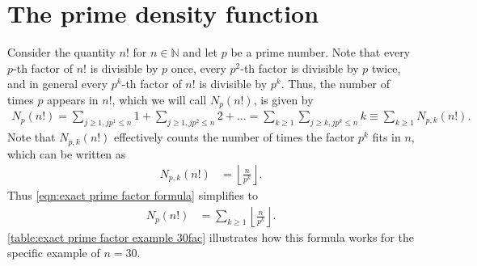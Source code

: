 \documentclass[english, parskip=full]{scrartcl}
\title{\titel}
\author{\autor}
\date{\today}
\begin{document}
\maketitle  %


\section{The prime density function}
Consider the quantity $n!$ for $n\in\mathbb{N}$ and let $p$ be a prime number.
Note that every $p$-th factor of $n!$ is divisible by $p$ once, every $p^2$-th factor is divisible by $p$ twice, and in general every $p^k$-th factor of $n!$ is divisible by $p^k$.
Thus, the number of times $p$ appears in $n!$, which we will call $N_p(n!)$, is given by
\begin{align}
N_p(n!) = \sum_{j\ge 1, jp^1\le n}1 + \sum_{j\ge 1, jp^2\le n}2 + \dots = \sum_{k \ge 1} \sum_{j \ge k, jp^k \le n} k \equiv \sum_{k\ge 1} N_{p,k}(n!). \label{eqn:exact prime factor formula}
\end{align}
Note that $N_{p,k}(n!)$ effectively counts the number of times the factor $p^k$ fits in $n$, which can be written as
\begin{align}
N_{p,k}(n!) &= \left\lfloor \frac{n}{p^k} \right\rfloor.
\end{align}
Thus \autoref{eqn:exact prime factor formula} simplifies to
\begin{align}
N_p(n!) &= \sum_{k \ge 1} \left\lfloor \frac{n}{p^k} \right\rfloor.  \label{eqn:exact prime factor of n factorial}
\end{align}
\autoref{table:exact prime factor example 30fac} illustrates how this formula works for the specific example of $n=30$.
\end{document}
